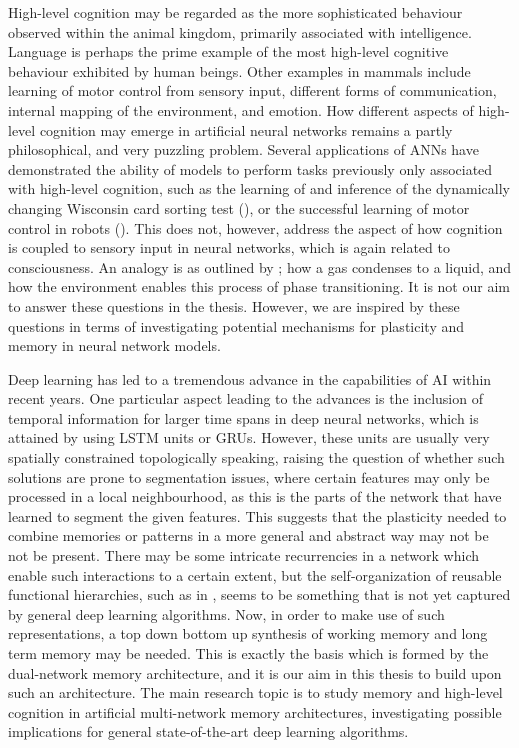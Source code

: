 High-level cognition may be regarded as the more sophisticated behaviour observed within the animal kingdom, primarily associated with intelligence. Language is perhaps the prime example of the most high-level cognitive behaviour exhibited by human beings. Other examples in mammals include learning of motor control from sensory input, different forms of communication, internal mapping of the environment, and emotion.
How different aspects of high-level cognition may emerge in artificial neural networks remains a partly philosophical, and very puzzling problem. Several applications of ANNs have demonstrated the ability of models to perform tasks previously only associated with high-level cognition, such as the learning of and inference of the dynamically changing Wisconsin card sorting test (\cite{Maniadakis2012}), or the successful learning of motor control in robots (\cite{Sugita2005, Yamashita2008, Tani2014}). 
This does not, however, address the aspect of how cognition is coupled to sensory input in neural networks, which is again related to consciousness. An analogy is as outlined by \cite{Freeman2003}; how a gas condenses to a liquid, and how the environment enables this process of phase transitioning.
It is not our aim to answer these questions in the thesis. However, we are inspired by these questions in terms of investigating potential mechanisms for plasticity and memory in neural network models.



Deep learning has led to a tremendous advance in the capabilities of AI within recent years. One particular aspect leading to the advances is the inclusion of temporal information for larger time spans in deep neural networks, which is attained by using LSTM units or GRUs. However, these units are usually very spatially constrained topologically speaking, raising the question of whether such solutions are prone to segmentation issues, where certain features may only be processed in a local neighbourhood, as this is the parts of the network that have learned to segment the given features. This suggests that the plasticity needed to combine memories or patterns in a more general and abstract way may not be not be present. There may be some intricate recurrencies in a network which enable such interactions to a certain extent, but the self-organization of reusable functional hierarchies, such as in \cite{Tani2014}, seems to be something that is not yet captured by general deep learning algorithms. Now, in order to make use of such representations, a top down bottom up synthesis of working memory and long term memory may be needed. This is exactly the basis which is formed by the dual-network memory architecture, and it is our aim in this thesis to build upon such an architecture. 
The main research topic is to study memory and high-level cognition in artificial multi-network memory architectures, investigating possible implications for general state-of-the-art deep learning algorithms.

